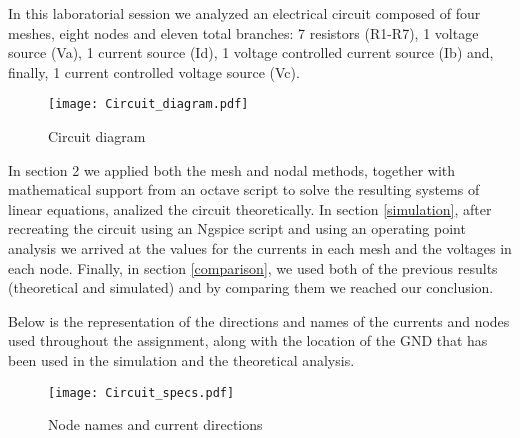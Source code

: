 \hspace{12pt} In this laboratorial session we analyzed an electrical circuit composed of four meshes, eight nodes and eleven total branches: 7 resistors (R1-R7), 1 voltage source (Va), 1 current source (Id), 1 voltage controlled current source (Ib) and, finally, 1 current controlled voltage source (Vc).

\begin{figure}[h]
	\centering
	\texttt{[image: Circuit\_diagram.pdf]}
	\caption{Circuit diagram}
	\label{fig:circuit}
\end{figure}

In section 2 we applied both the mesh and nodal methods, together with mathematical support from an octave script to solve the resulting systems of linear equations, analized the circuit theoretically. In section \ref{simulation}, after recreating the circuit using an Ngspice script and using an operating point analysis we arrived at the values for the currents in each mesh and the voltages in each node. 
Finally, in section \ref{comparison}, we used both of the previous results (theoretical and simulated) and by comparing them we reached our conclusion.

Below is the representation of the directions and names of the currents and nodes used throughout the assignment, along with the location of the GND that has been used in the simulation and the theoretical analysis.
\begin{figure}[h]
	\centering
	\texttt{[image: Circuit\_specs.pdf]}
	\caption{Node names and current directions}
	\label{fig:circuit_spec}
\end{figure}

\pagebreak
